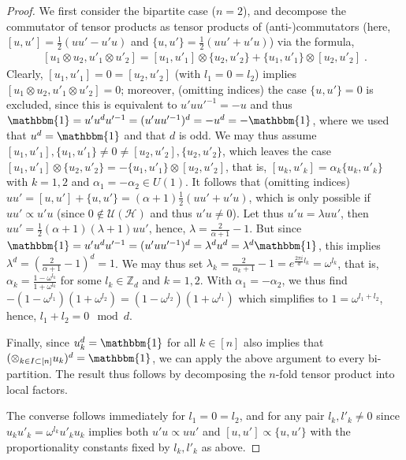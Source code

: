 \documentclass[aps,pra,letterpaper,onrcolumn,nofootinbib,notitlepage,longbibliography]{revtex4-1}
\newcommand{\one}{\mathbbm{1}}
\newcommand{\UH}{\mc{U}(\cH)}
\newcommand{\zz}{\mathbb Z}
\newcommand\mc[1]{\mathcal{#1}}
\newcommand{\cH}{\mc{H}}
\begin{document}
\begin{proof}
    We first consider the bipartite case ($n=2$), and decompose the commutator of tensor products as tensor products of (anti-)commutators (here, $[u,u']=\frac{1}{2}(uu'-u'u)$ and $\{u,u'\}=\frac{1}{2}(uu'+u'u)$) via the formula,
    \begin{align}\label{eq: commutator factorisation}
        [u_1\otimes u_2,u'_1\otimes u'_2]=[u_1,u'_1]\otimes\{u_2,u'_2\}+\{u_1,u'_1\}\otimes[u_2,u'_2]\; .
    \end{align}
    Clearly, $[u_1,u'_1]=0=[u_2,u'_2]$ (with $l_1=0=l_2$) implies $[u_1\otimes u_2,u'_1\otimes u'_2]=0$; moreover, (omitting indices) the case $\{u,u'\}=0$ is excluded, since this is equivalent to $u'uu'^{-1}=-u$ and thus $\mathbbm{1}=u'u^du'^{-1}=(u'uu'^{-1})^d=-u^d=-\mathbbm{1}$, where we used that $u^d=\mathbbm{1}$ and that $d$ is odd. We may thus assume $[u_1,u'_1],\{u_1,u'_1\}\neq 0\neq [u_2,u'_2],\{u_2,u'_2\}$, which leaves the case $[u_1,u'_1]\otimes\{u_2,u'_2\}=-\{u_1,u'_1\}\otimes[u_2,u'_2]$, that is, $[u_k,u'_k]=\alpha_k\{u_k,u'_k\}$ with $k=1,2$ and $\alpha_1=-\alpha_2\in U(1)$. It follows that (omitting indices) $uu'=[u,u']+\{u,u'\}=(\alpha+1)\frac{1}{2}(uu'+u'u)$, which is only possible if $uu'\propto u'u$ (since $0\notin\UH$ and thus $u'u\neq 0$). Let thus $u'u=\lambda uu'$, then $uu'=\frac{1}{2}(\alpha+1)(\lambda+1)uu'$, hence, $\lambda=\frac{2}{\alpha+1}-1$. But since $\mathbbm{1}=u'u^du'^{-1}=(u'uu'^{-1})^d=\lambda^d u^d=\lambda^d\mathbbm{1}$, this implies $\lambda^d=(\frac{2}{\alpha+1}-1)^d=1$. We may thus set $\lambda_k=\frac{2}{\alpha_k+1}-1=e^{\frac{2\pi i}{d}l_k}=\omega^{l_k}$, that is, $\alpha_k=\frac{1-\omega^{l_k}}{1+\omega^{l_k}}$ for some $l_k\in\zz_d$ and $k=1,2$. With $\alpha_1=-\alpha_2$, we thus find $-(1-\omega^{l_1})(1+\omega^{l_2})=(1-\omega^{l_2})(1+\omega^{l_1})$ which simplifies to $1=\omega^{l_1+l_2}$, hence, $l_1+l_2=0\mod d$.

    Finally, since $u^d_k=\one$ for all $k\in[n]$ also implies that $(\otimes_{k\in I\subset[n]}u_k)^d=\one$, we can apply the above argument to every bi-partition. The result thus follows by decomposing the $n$-fold tensor product into local factors.

    The converse follows immediately for $l_1=0=l_2$, and for any pair $l_k,l'_k\neq 0$ since $u_ku'_k=\omega^{l_k}u'_ku_k$ implies both $u'u\propto uu'$ and $[u,u']\propto\{u,u'\}$ with the proportionality constants fixed by $l_k,l'_k$ as above.
\end{proof}
\end{document}

